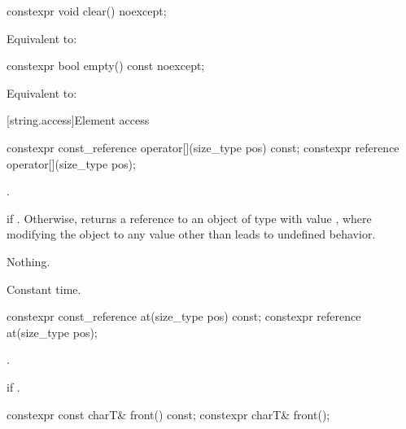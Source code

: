 %
\begin{itemdecl}
constexpr void clear() noexcept;
\end{itemdecl}

\begin{itemdescr}
\pnum
\effects
Equivalent to: 
\end{itemdescr}

%
\begin{itemdecl}
constexpr bool empty() const noexcept;
\end{itemdecl}

\begin{itemdescr}
\pnum
\effects
Equivalent to:
\end{itemdescr}

[string.access]{Element access}

%
\begin{itemdecl}
constexpr const_reference operator[](size_type pos) const;
constexpr reference       operator[](size_type pos);
\end{itemdecl}

\begin{itemdescr}
\pnum
\expects
{}.

\pnum
\returns
{} if . Otherwise,
returns a reference to an object of type  with value
, where modifying the object to any value other than
 leads to undefined behavior.

\pnum
\throws
Nothing.

\pnum
\complexity
Constant time.
\end{itemdescr}

%
\begin{itemdecl}
constexpr const_reference at(size_type pos) const;
constexpr reference       at(size_type pos);
\end{itemdecl}

\begin{itemdescr}
\pnum
\returns
{}.

\pnum
\throws
{}
if
.
\end{itemdescr}

%
\begin{itemdecl}
constexpr const charT& front() const;
constexpr charT& front();
\end{itemdecl}

